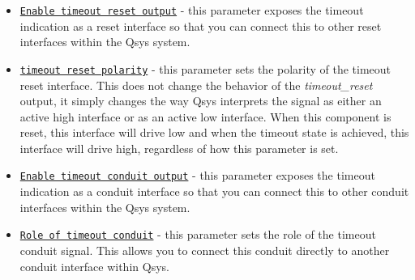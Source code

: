 \documentclass{article}
\begin{document}
\begin{flushleft}
\begin{itemize}
\item \texttt{\underline{Enable timeout reset output}} - this parameter exposes the timeout indication as a reset interface so that you can connect this to other reset interfaces within the Qsys system.

\item \texttt{\underline{timeout reset polarity}} - this parameter sets the polarity of the timeout reset interface.  This does not change the behavior of the \emph{timeout\_reset} output, it simply changes the way Qsys interprets the signal as either an active high  interface or as an active low  interface.  When this component is reset, this interface will drive low and when the timeout state is achieved, this interface will drive high, regardless of how this parameter is set.

\item \texttt{\underline{Enable timeout conduit output}} - this parameter exposes the timeout indication as a conduit interface so that you can connect this to other conduit interfaces within the Qsys system.

\item \texttt{\underline{Role of timeout conduit}} - this parameter sets the role of the timeout conduit signal.  This allows you to connect this conduit directly to another conduit interface within Qsys.

\end{itemize}

\end{flushleft}

\end{document}
